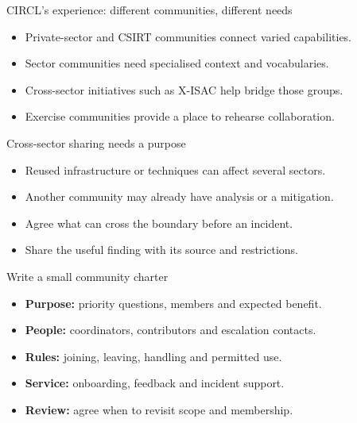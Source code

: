 \begin{frame}{CIRCL's experience: different communities, different needs}
\begin{itemize}
\item Private-sector and CSIRT communities connect varied capabilities.
\item Sector communities need specialised context and vocabularies.
\item Cross-sector initiatives such as X-ISAC help bridge those groups.
\item Exercise communities provide a place to rehearse collaboration.
\end{itemize}
\end{frame}

\begin{frame}{Cross-sector sharing needs a purpose}
\begin{itemize}
\item Reused infrastructure or techniques can affect several sectors.
\item Another community may already have analysis or a mitigation.
\item Agree what can cross the boundary before an incident.
\item Share the useful finding with its source and restrictions.
\end{itemize}
\end{frame}

\begin{frame}{Write a small community charter}
\begin{itemize}
\item \textbf{Purpose:} priority questions, members and expected benefit.
\item \textbf{People:} coordinators, contributors and escalation contacts.
\item \textbf{Rules:} joining, leaving, handling and permitted use.
\item \textbf{Service:} onboarding, feedback and incident support.
\item \textbf{Review:} agree when to revisit scope and membership.
\end{itemize}
\end{frame}

